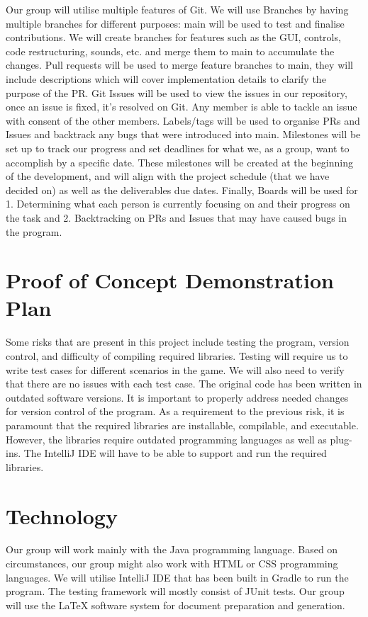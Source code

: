 \documentclass{article}
\begin{document}
Our group will utilise multiple features of Git. We will use Branches by having multiple branches for different purposes: main will be used to test and finalise contributions. We will create branches for features such as the GUI, controls, code restructuring, sounds, etc. and merge them to main to accumulate the changes. Pull requests will be used to merge feature branches to main, they will include descriptions which will cover implementation details to clarify the purpose of the PR. Git Issues will be used to view the issues in our repository, once an issue is fixed, it’s resolved on Git. Any member is able to tackle an issue with consent of the other members. Labels/tags will be used to organise PRs and Issues and backtrack any bugs that were introduced into main. Milestones will be set up to track our progress and set deadlines for what we, as a group, want to accomplish by a specific date. These milestones will be created at the beginning of the development, and will align with the project schedule (that we have decided on) as well as the deliverables due dates. Finally, Boards will be used for 1. Determining what each person is currently focusing on and their progress on the task and 2. Backtracking on PRs and Issues that may have caused bugs in the program.


\section{Proof of Concept Demonstration Plan}

Some risks that are present in this project include testing the program, version control, and difficulty of compiling required libraries. Testing will require us to write test cases for different scenarios in the game. We will also need to verify that there are no issues with each test case. The original code has been written in outdated software versions. It is important to properly address needed changes for version control of the program. As a requirement to the previous risk, it is paramount that the required libraries are installable, compilable, and executable. However, the libraries require outdated programming languages as well as plug-ins. The IntelliJ IDE will have to be able to support and run the required libraries. 

\section{Technology}

Our group will work mainly with the Java programming language. Based on circumstances, our group might also work with HTML or CSS programming languages. We will utilise IntelliJ IDE that has been built in Gradle to run the program. The testing framework will mostly consist of JUnit tests. Our group will use the LaTeX software system for document preparation and generation.
\end{document}

